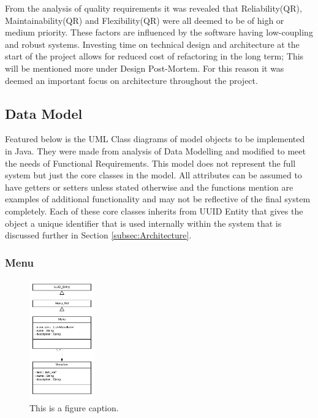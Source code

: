 From the analysis of quality requirements it was revealed that Reliability(QR), Maintainability(QR) and Flexibility(QR) were all deemed to be of high or medium priority. These factors are influenced by the software having low-coupling and robust systems. Investing time on technical design and architecture at the start of the project allows for reduced cost of refactoring in the long term; This will be mentioned more under Design Post-Mortem. For this reason it was deemed an important focus on architecture throughout the project.

\subsection{Data Model}
Featured below is the UML Class diagrams of model objects to be implemented in Java. They were made from analysis of Data Modelling and modified to meet the needs of Functional Requirements. This model does not represent the full system but just the core classes in the model. All attributes can be assumed to have getters or setters unless stated otherwise and the functions mention are examples of additional functionality and may not be reflective of the final system completely.
Each of these core classes inherits from UUID Entity that gives the object a unique identifier that is used internally within the system that is discussed further in Section \ref{subsec:Architecture}.

\subsubsection{Menu}

\begin{figure}
	\centering
	\includegraphics[width=0.25\textwidth]{images/data_model/menu.png}
	\caption{This is a figure caption.} \label{fig:UML_Menu}
\end{figure}


